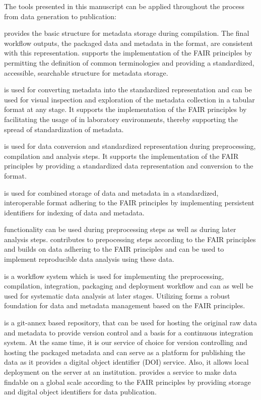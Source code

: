 The tools presented in this manuscript can be applied throughout the process from data generation to publication:
\begin{description}
 \setlength\itemsep{0pt}
 \item[\software{odML}] provides the basic structure for metadata storage during compilation. The final workflow outputs, the packaged data and metadata in the  format, are consistent with this representation.  supports the implementation of the FAIR principles by permitting the definition of common terminologies and providing a standardized, accessible, searchable structure for metadata storage. 
 \item[\software{odMLtables}] is used for converting metadata into the standardized  representation and can be used for visual inspection and exploration of the metadata collection in a tabular format at any stage. It supports the implementation of the FAIR principles by facilitating the usage of  in laboratory environments, thereby supporting the spread of standardization of metadata.
 \item[\software{Neo}] is used for data conversion and standardized representation during preprocessing, compilation and analysis steps. It supports the implementation of the FAIR principles by providing a standardized data representation and conversion to the  format.
 \item[\software{Nix}] is used for combined storage of data and metadata in a standardized, interoperable format adhering to the FAIR principles  by implementing persistent identifiers for indexing of data and metadata.
 \item[\software{Elephant}] functionality can be used during preprocessing steps as well as during later analysis steps.  contributes to prepocessing steps according to the FAIR principles and builds on data adhering to the FAIR principles and can be used to implement reproducible data analysis using these data.
 \item[\software{snakemake}] is a workflow system which is used for implementing the preprocessing, compilation, integration, packaging and deployment workflow and can as well be used for systematic data analysis at later stages. Utilizing  forms a robust foundation for data and metadata management based on the FAIR principles.
 \item[\software{Gin}] is a git-annex based repository, that can be used for hosting the original raw data and metadata to provide version control and a basis for a continuous integration system. At the same time, it is our service of choice for version controlling and hosting the packaged metadata and can serve as a platform for publishing the data as it provides a digital object identifier (DOI) service. Also, it allows local deployment on the server at an institution.  provides a service to make data findable on a global scale according to the FAIR principles by providing storage and digital object identifiers for data publication.
\end{description}
